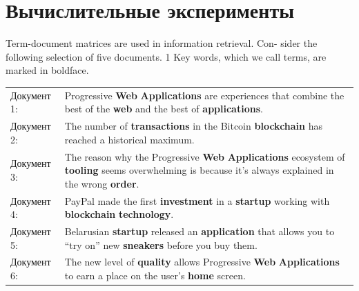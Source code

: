 
\newpage
\section{Вычислительные эксперименты}


\iffalse
Term-document matrices are used in information retrieval. Con-
sider the following selection of five documents. 1 Key words, which we call terms,
are marked in boldface.

\begin{longtable}{ l p{10cm} }
 Документ 1: & Progressive \textbf{Web} \textbf{Applications} are experiences that combine the best of the \textbf{web} and the best of \textbf{applications}. \\
 Документ 2: & The number of \textbf{transactions} in the Bitcoin \textbf{blockchain} has reached a historical maximum.\\
 Документ 3: & The reason why the Progressive \textbf{Web} \textbf{Applications} ecosystem of \textbf{tooling} seems overwhelming is because it’s always explained in the wrong \textbf{order}.\\
 Документ 4: & PayPal made the first \textbf{investment} in a \textbf{startup} working with \textbf{blockchain} \textbf{technology}.\\
 Документ 5: & Belarusian \textbf{startup} released an \textbf{application} that allows you to ``try on'' new \textbf{sneakers} before you buy them.\\
 Документ 6: & The new level of \textbf{quality} allows Progressive \textbf{Web} \textbf{Applications} to earn a place on the user's \textbf{home} screen. \\
\end{longtable}



